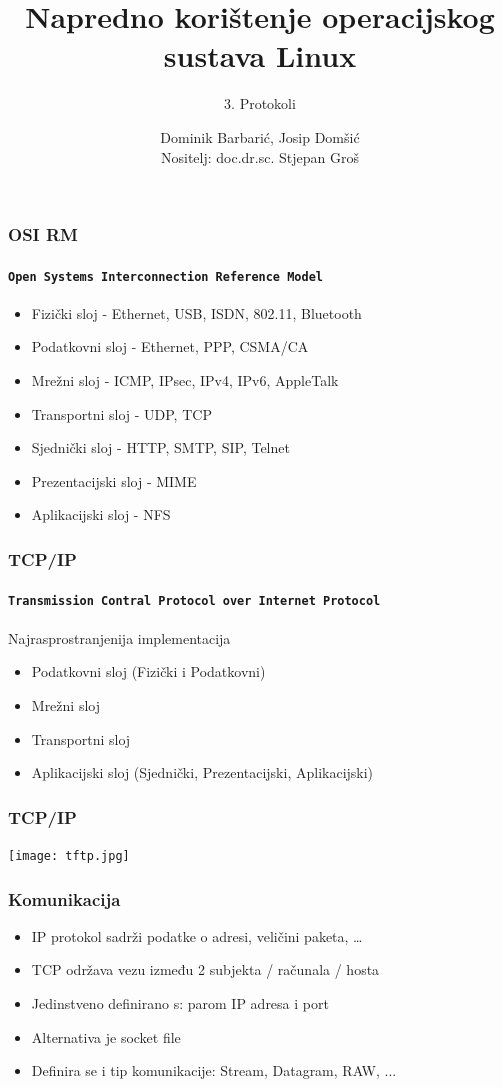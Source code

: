\documentclass[t,table,usenames,dvipsnames]{beamer}
\date{\todayiso}
\title[NKOSL]{Napredno korištenje operacijskog sustava Linux}
\author[Dominik Barbarić, Josip Domšić]{Dominik Barbarić, Josip Domšić\\{\small Nositelj: doc.dr.sc. Stjepan Groš}}
\subtitle{3. Protokoli}
\institute[FER]{Sveučilište u Zagrebu\\Fakultet elektrotehnike i računarstva}
\begin{document}
{
	\begin{frame}
		\maketitle
	\end{frame}
}

\begin{frame}
    \frametitle{OSI RM}
	\framesubtitle{\texttt{Open Systems Interconnection Reference Model}}
    \begin{itemize}
        \item Fizički sloj - Ethernet, USB, ISDN, 802.11, Bluetooth
        \item Podatkovni sloj - Ethernet, PPP, CSMA/CA 
        \item Mrežni sloj - ICMP, IPsec, IPv4, IPv6, AppleTalk
        \item Transportni sloj - UDP, TCP
        \item Sjednički sloj - HTTP, SMTP, SIP, Telnet
        \item Prezentacijski sloj - MIME
        \item Aplikacijski sloj - NFS
    \end{itemize}

\end{frame}

\begin{frame}
    \frametitle{TCP/IP}
	\framesubtitle{\texttt{Transmission Contral Protocol over Internet Protocol}}
    Najrasprostranjenija implementacija
    \begin{itemize}
        \item Podatkovni sloj (Fizički i Podatkovni)
        \item Mrežni sloj
        \item Transportni sloj
        \item Aplikacijski sloj (Sjednički, Prezentacijski, Aplikacijski)
    \end{itemize}
\end{frame}


\begin{frame}
    \frametitle{TCP/IP}
    \texttt{[image: tftp.jpg]}
\end{frame}


\begin{frame}
	\frametitle{Komunikacija}
    \begin{itemize}
        \item IP protokol sadrži podatke o adresi, veličini paketa, \ldots
        \item TCP održava vezu između 2 subjekta / računala / hosta
        \item Jedinstveno definirano s: parom IP adresa i port
        \item Alternativa je socket file
        \item Definira se i tip komunikacije: Stream, Datagram, RAW, ...
    \end{itemize}
\end{frame}
\end{document}
